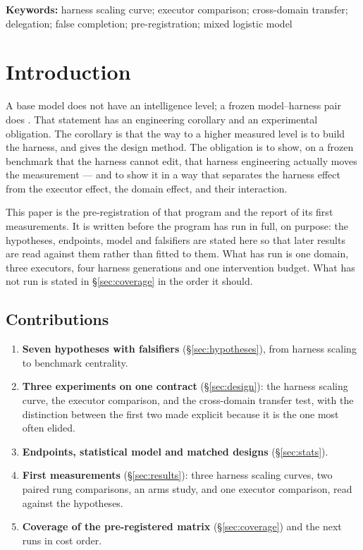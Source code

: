 \documentclass[11pt]{article}
\theoremstyle{definition}
\begin{document}
\noindent\textbf{Keywords:} harness scaling curve; executor comparison; cross-domain transfer; delegation; false completion; pre-registration; mixed logistic model

\tableofcontents
\bigskip

\section{Introduction}\label{sec:intro}

A base model does not have an intelligence level; a frozen model--harness pair does \citep{yang2026unified}. That statement has an engineering corollary and an experimental obligation. The corollary is that the way to a higher measured level is to build the harness, and \citet{yang2026agents} gives the design method. The obligation is to show, on a frozen benchmark that the harness cannot edit, that harness engineering actually moves the measurement --- and to show it in a way that separates the harness effect from the executor effect, the domain effect, and their interaction.

This paper is the pre-registration of that program and the report of its first measurements. It is written before the program has run in full, on purpose: the hypotheses, endpoints, model and falsifiers are stated here so that later results are read against them rather than fitted to them. What has run is one domain, three executors, four harness generations and one intervention budget. What has not run is stated in \S\ref{sec:coverage} in the order it should.

\subsection{Contributions}

\begin{enumerate}[leftmargin=*]
\item \textbf{Seven hypotheses with falsifiers} (\S\ref{sec:hypotheses}), from harness scaling to benchmark centrality.
\item \textbf{Three experiments on one contract} (\S\ref{sec:design}): the harness scaling curve, the executor comparison, and the cross-domain transfer test, with the distinction between the first two made explicit because it is the one most often elided.
\item \textbf{Endpoints, statistical model and matched designs} (\S\ref{sec:stats}).
\item \textbf{First measurements} (\S\ref{sec:results}): three harness scaling curves, two paired rung comparisons, an arms study, and one executor comparison, read against the hypotheses.
\item \textbf{Coverage of the pre-registered matrix} (\S\ref{sec:coverage}) and the next runs in cost order.
\end{enumerate}
\end{document}
